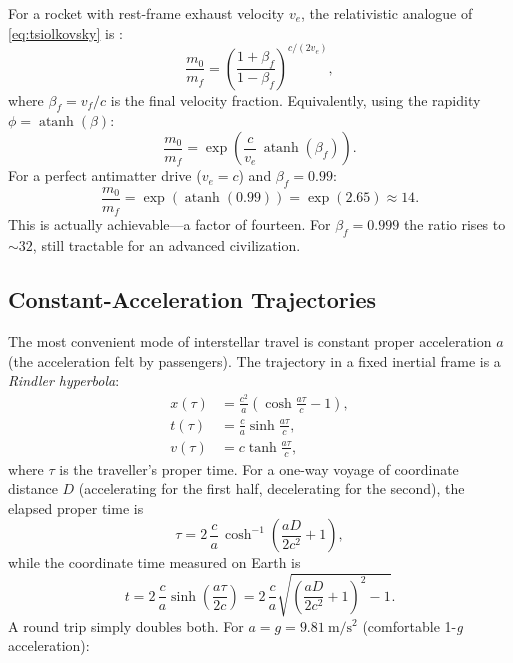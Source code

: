 \documentclass[12pt,a4paper]{article}
\DeclareMathOperator{\atanh}{atanh}
\begin{document}
For a rocket with rest-frame exhaust velocity $v_e$, the relativistic
analogue of \eqref{eq:tsiolkovsky} is \citep{Ackeret1946}:
\begin{equation}
  \boxed{\frac{m_0}{m_f} = \left(\frac{1+\beta_f}{1-\beta_f}\right)^{c/(2v_e)},}
  \label{eq:rel_rocket}
\end{equation}
where $\beta_f = v_f/c$ is the final velocity fraction. Equivalently, using the
rapidity $\phi = \atanh(\beta)$:
\begin{equation}
  \frac{m_0}{m_f} = \exp\!\left(\frac{c}{v_e}\,\atanh(\beta_f)\right).
  \label{eq:rel_rocket_rap}
\end{equation}
For a perfect antimatter drive ($v_e = c$) and $\beta_f = 0.99$:
\begin{equation*}
  \frac{m_0}{m_f} = \exp\!\left(\atanh(0.99)\right) = \exp(2.65) \approx 14.
\end{equation*}
This is actually achievable---a factor of fourteen. For $\beta_f=0.999$
the ratio rises to $\sim 32$, still tractable for an advanced civilization.

\subsection{Constant-Acceleration Trajectories}

The most convenient mode of interstellar travel is constant proper acceleration
$a$ (the acceleration felt by passengers). The trajectory in a fixed inertial
frame is a \emph{Rindler hyperbola}:
\begin{align}
  x(\tau) &= \frac{c^2}{a}\!\left(\cosh\frac{a\tau}{c} - 1\right),
    \label{eq:rindler_x}\\
  t(\tau)  &= \frac{c}{a}\sinh\frac{a\tau}{c},
    \label{eq:rindler_t}\\
  v(\tau)  &= c\tanh\frac{a\tau}{c},
    \label{eq:rindler_v}
\end{align}
where $\tau$ is the traveller's proper time. For a one-way voyage of coordinate
distance $D$ (accelerating for the first half, decelerating for the second),
the elapsed proper time is
\begin{equation}
  \tau = 2\,\frac{c}{a}\,\cosh^{-1}\!\!\left(\frac{aD}{2c^2}+1\right),
  \label{eq:oneway_proper}
\end{equation}
while the coordinate time measured on Earth is
\begin{equation}
  t = 2\,\frac{c}{a}\sinh\!\left(\frac{a\tau}{2c}\right)
    = 2\,\frac{c}{a}\sqrt{\left(\frac{aD}{2c^{2}}+1\right)^{2}-1}.
  \label{eq:oneway_coord}
\end{equation}
A round trip simply doubles both. For $a = g = \SI{9.81}{\meter\per\second\squared}$
(comfortable 1-\textit{g} acceleration):
\end{document}
